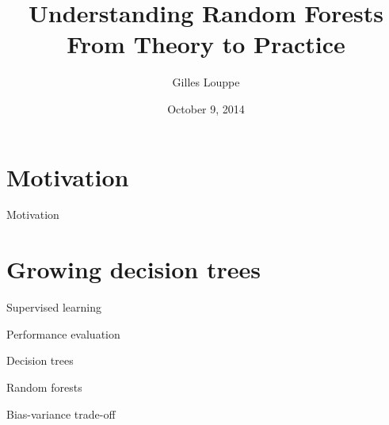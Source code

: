 \documentclass{beamer}
\title{{\bf Understanding Random Forests}\\
From Theory to Practice}
\author{Gilles Louppe}
\institute{Université de Liège, Belgium}
\date{October 9, 2014}
\begin{document}

\begin{frame}
\titlepage
\end{frame}



\section{Motivation}

\begin{frame}{Motivation}
\end{frame}



\section{Growing decision trees}

\begin{frame}{Supervised learning}
\end{frame}

\begin{frame}{Performance evaluation}
\end{frame}




\begin{frame}{Decision trees}
\end{frame}



\begin{frame}{Random forests}
\end{frame}



\begin{frame}{Bias-variance trade-off}
\end{frame}
\end{document}
